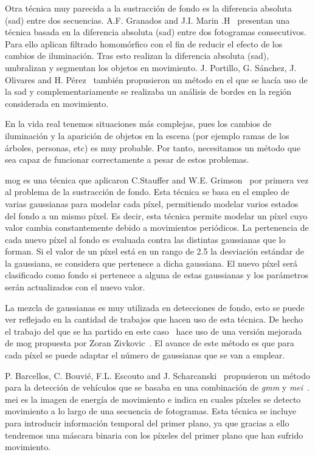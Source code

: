 Otra técnica muy parecida a la sustracción de fondo es la diferencia absoluta (\acrfull{sad}) entre dos secuencias. A.F. Granados and J.I. Marin .H~\cite{deteccion_flujo_vehicular} presentan una técnica basada  en la diferencia absoluta (\acrshort{sad}) entre dos fotogramas consecutivos. Para ello aplican filtrado homomórfico con el fin de reducir el efecto de los cambios de iluminación. Tras esto realizan la diferencia absoluta (\acrshort{sad}), umbralizan y segmentan los objetos en movimiento. J. Portillo, G. Sánchez, J. Olivares and H. Pérez~\cite{deteccion_movimiento} también propusieron un método en el que se hacía uso de la \acrshort{sad} y complementariamente se realizaba un análisis de bordes en la región considerada en movimiento.

En la vida real tenemos situaciones más complejas, pues los cambios de iluminación y la aparición de objetos en la escena (por ejemplo ramas de los árboles, personas, etc) es muy probable. Por tanto, necesitamos un método que sea capaz de funcionar correctamente a pesar de estos problemas.

\acrfull{mog} es una técnica que aplicaron C.Stauffer and  W.E.  Grimson~\cite{adaptative_background} por primera vez al problema de la sustracción de fondo. Esta técnica se basa en el empleo de varias gaussianas para modelar cada píxel, permitiendo modelar varios estados del fondo a un mismo píxel. Es decir, esta técnica permite modelar un píxel cuyo valor cambia constantemente debido a movimientos periódicos.  La pertenencia de cada nuevo píxel al fondo es evaluada contra las distintas gaussianas que lo forman. Si el valor de un píxel está en un rango de 2.5 la desviación estándar de la gaussiana, se considera que pertenece a dicha gaussiana. El nuevo píxel será clasificado como fondo si pertenece a alguna de estas gaussianas y los parámetros serán actualizados con el nuevo valor.

La mezcla de gaussianas es muy utilizada en detecciones de fondo, esto se puede ver reflejado en la cantidad de trabajos que hacen uso de esta técnica. De hecho el trabajo del que se ha partido en este caso~\cite{redo_tesis} hace uso de una versión mejorada de \acrshort{mog} propuesta por Zoran Zivkovic~\cite{zoran_zivkovic}. El avance de este método es que para cada píxel se puede adaptar el número de gaussianas que se van a emplear.


P. Barcellos, C. Bouvié, F.L. Escouto and  J. Scharcanski~\cite{gmm_mei_article} propusieron un método para la detección de vehículos que se basaba en una combinación de \textit{\acrfull{gmm}} y \textit{\acrfull{mei}}~\cite{mei_article}. \acrshort{mei} es la imagen de energía de movimiento e indica en cuales píxeles se detecto movimiento a lo largo de una secuencia de fotogramas. Esta técnica se incluye para introducir información temporal del primer plano, ya que gracias a ello tendremos una máscara binaria con los píxeles del primer plano que han sufrido movimiento.

